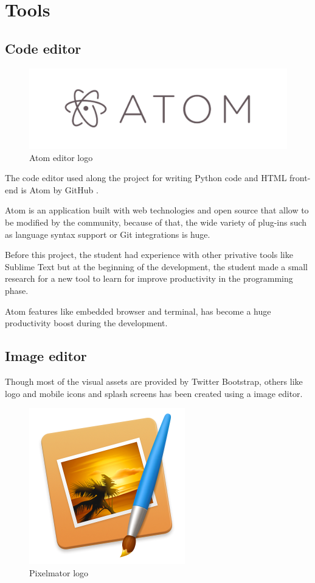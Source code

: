 \documentclass{DeustoFDP}
\begin{document}
\section{Tools}
\subsection{Code editor}
\begin{figure}[h]
\centering
\includegraphics[width=0.7\linewidth]{fig/atom}
\caption[Atom editor logo]{Atom editor logo}
\label{fig:atom}
\end{figure}

The code editor used along the project for writing Python code and HTML front-end is Atom by GitHub \cite{atom}.

Atom is an application built with web technologies and open source that allow to be modified by the community, because of that, the wide variety of plug-ins such as language syntax support or Git integrations is huge.

Before this project, the student had experience with other privative tools like Sublime Text but at the beginning of the development, the student made a small research for a new tool to learn for improve productivity in the programming phase.

Atom features like embedded browser and terminal, has become a huge productivity boost during the development.
\subsection{Image editor}
Though most of the visual assets are provided by Twitter Bootstrap, others like logo and mobile icons and splash screens has been created using a image editor.

\begin{figure}[h]
\centering
\includegraphics[width=0.3\linewidth]{fig/pixelmator}
\caption[Pixelmator logo]{Pixelmator logo}
\label{fig:pixelmator}
\end{figure}
\end{document}
